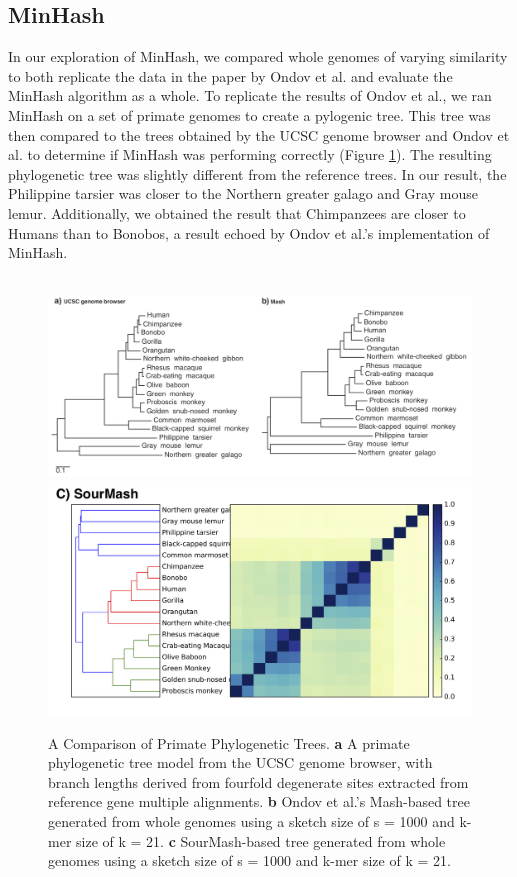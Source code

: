 \documentclass[12pt, letterpaper]{article}
\begin{document}
\subsection{MinHash}
In our exploration of MinHash, we compared whole genomes of varying similarity to both replicate the data in the paper by Ondov et al. and evaluate the MinHash algorithm as a whole. To replicate the results of Ondov et al., we ran MinHash on a set of primate genomes to create a pylogenic tree. This tree was then compared to the trees obtained by the UCSC genome browser and Ondov et al. to determine if MinHash was performing correctly (Figure \ref{fig:Primate Tree}). The resulting phylogenetic tree was slightly different from the reference trees. In our result, the Philippine tarsier was closer to the Northern greater galago and Gray mouse lemur. Additionally, we obtained the result that Chimpanzees are closer to Humans than to Bonobos, a result echoed by Ondov et al.'s implementation of MinHash. \\ \\
\begin{figure}[h]
    \centering
    \includegraphics[width=1.0\textwidth]{Figure4_Ondov}
    \includegraphics[width=1.0\textwidth]{Apes_Matrix_Common}
    \caption{A Comparison of Primate Phylogenetic Trees. \textbf{a} A primate phylogenetic tree model from the UCSC genome browser, with branch lengths derived from fourfold degenerate sites extracted from reference gene multiple alignments. \textbf{b} Ondov et al.'s Mash-based tree generated from whole genomes using a sketch size of s = 1000 and k-mer size of k = 21.\cite{MinHash} \textbf{c} SourMash-based tree generated from whole genomes using a sketch size of s = 1000 and k-mer size of k = 21.}
    \label{fig:Primate Tree}
\end{figure}
\end{document}
